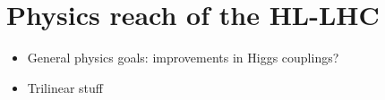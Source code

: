 \section{Physics reach of the HL-LHC}\label{sec:trilinear}

\begin{itemize}
    \item General physics goals: improvements in Higgs couplings?
    \item Trilinear stuff
\end{itemize}